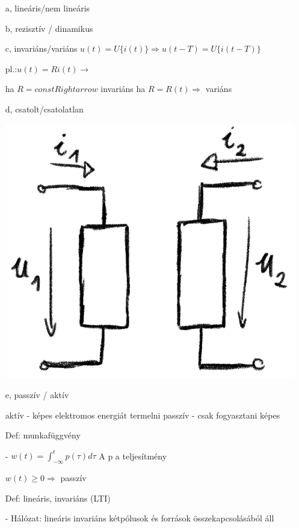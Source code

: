 \documentclass[12pt]{article}
\begin{document}
        \begin{itemize}
            \item[a,] lineáris/nem lineáris
            \item[b,] rezisztív / dinamikus
            \item[c,] invariáns/variáns
                $u(t) = U\{i(t)\} \Rightarrow u(t-T) = U\{i(t-T)\}$

                pl.:$u(t) = R i(t) \rightarrow$

                    ha $R=const Rightarrow$ invariáns
                    ha $R=R(t) \Rightarrow$ variáns
            \item[d,] csatolt/csatolatlan
            
                \includegraphics{img/1.png}

            \item[e,] passzív / aktív

            aktív - képes elektromos energiát termelni 
            passzív - csak fogyasztani képes
    
                Def: munkafüggvény 
    
                - $w(t) =\int_{-\infty}^{t}p(\tau)d\tau$
                A p a teljesítmény 
    
                $w(t) \geq 0 \Rightarrow $ passzív
            
                Def: lineáris, invariáns (LTI) 
    
                - Hálózat: lineáris invariáns kétpólusok és források összekapcsolásából áll
    
        \end{itemize}
\end{document}

